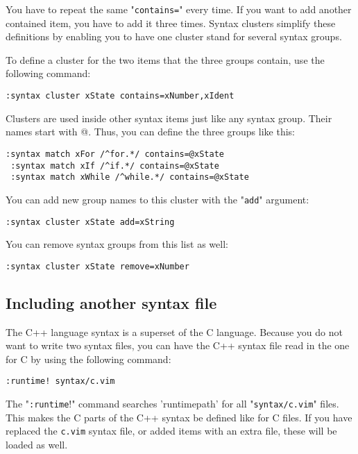 You have to repeat the same "\verb!contains=!" every time.
If you want to add another contained item, you have to add it three times.
Syntax clusters simplify these definitions by enabling you to have one cluster stand for several syntax groups.

To define a cluster for the two items that the three groups contain, use the following command:

\begin{Verbatim}[samepage=true]
 :syntax cluster xState contains=xNumber,xIdent
\end{Verbatim}

Clusters are used inside other syntax items just like any syntax group.
Their names start with @.
Thus, you can define the three groups like this:

\begin{Verbatim}[samepage=true]
 :syntax match xFor /^for.*/ contains=@xState
 :syntax match xIf /^if.*/ contains=@xState
 :syntax match xWhile /^while.*/ contains=@xState
\end{Verbatim}

You can add new group names to this cluster with the "\verb!add!" argument:

\begin{Verbatim}[samepage=true]
 :syntax cluster xState add=xString
\end{Verbatim}

You can remove syntax groups from this list as well:

\begin{Verbatim}[samepage=true]
 :syntax cluster xState remove=xNumber
\end{Verbatim}

\subsection{Including another syntax file}
The C++ language syntax is a superset of the C language.
Because you do not want to write two syntax files, you can have the C++ syntax file read in the one for C by using the following command:

\begin{Verbatim}[samepage=true]
 :runtime! syntax/c.vim
\end{Verbatim}

The "\verb!:runtime!!" command searches 'runtimepath' for all "\verb!syntax/c.vim!" files.
This makes the C parts of the C++ syntax be defined like for C files.
If you have replaced the \verb!c.vim! syntax file, or added items with an extra file, these will be loaded as well.

